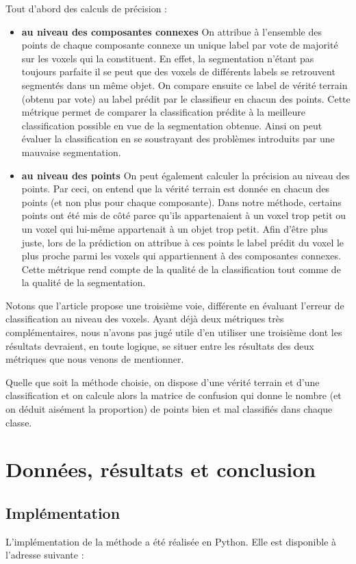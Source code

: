 \documentclass[a4paper, onecolumn, 11pt]{article}
\begin{document}
Tout d'abord des calculs de précision :
\begin{itemize}
\item \textbf{au niveau des composantes connexes} On attribue à l'ensemble des points de chaque composante connexe un unique label par vote de majorité sur les voxels qui la constituent. En effet, la segmentation n'étant pas toujours parfaite il se peut que des voxels de différents labels se retrouvent segmentés dans un même objet. On compare ensuite ce label de vérité terrain (obtenu par vote) au label prédit par le classifieur en chacun des points. Cette métrique permet de comparer la classification prédite à la meilleure classification possible en vue de la segmentation obtenue. Ainsi on peut évaluer la classification en se soustrayant des problèmes introduits par une mauvaise segmentation.

\item \textbf{au niveau des points} On peut également calculer la précision au niveau des points. Par ceci, on entend que la vérité terrain est donnée en chacun des points (et non plus pour chaque composante). Dans notre méthode, certains points ont été mis de côté parce qu'ils appartenaient à un voxel trop petit ou un voxel qui lui-même appartenait à un objet trop petit. Afin d'être plus juste, lors de la prédiction on attribue à ces points le label prédit du voxel le plus proche parmi les voxels qui appartiennent à des composantes connexes. Cette métrique rend compte de la qualité de la classification tout comme de la qualité de la segmentation.
\end{itemize}

Notons que l'article \cite{aka_article} propose une troisième voie, différente en évaluant l'erreur de classification au niveau des voxels. Ayant déjà deux métriques très complémentaires, nous n'avons pas jugé utile d'en utiliser une troisième dont les résultats devraient, en toute logique, se situer entre les résultats des deux métriques que nous venons de mentionner.

Quelle que soit la méthode choisie, on dispose d'une vérité terrain et d'une classification et on calcule alors la matrice de confusion qui donne le nombre (et on déduit aisément la proportion) de points bien et mal classifiés dans chaque classe.

\section{Données, résultats et conclusion}
\subsection{Implémentation}
L'implémentation de la méthode a été réalisée en Python. Elle est disponible à l'adresse suivante :
\end{document}
